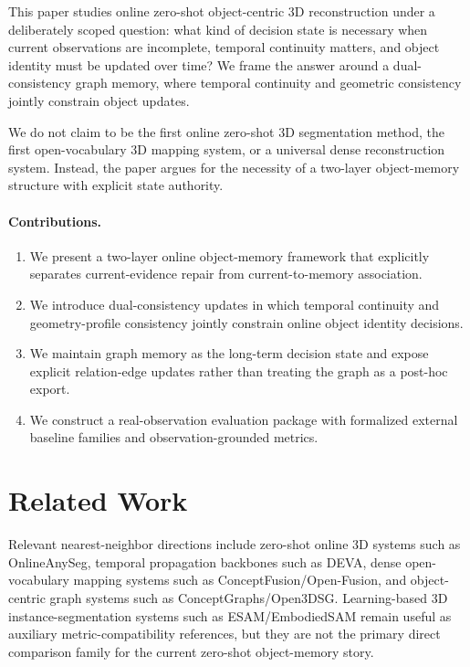\documentclass[11pt]{article}
\begin{document}
This paper studies online zero-shot object-centric 3D reconstruction under a deliberately scoped question: what kind of decision state is necessary when current observations are incomplete, temporal continuity matters, and object identity must be updated over time? We frame the answer around a dual-consistency graph memory, where temporal continuity and geometric consistency jointly constrain object updates.

We do not claim to be the first online zero-shot 3D segmentation method, the first open-vocabulary 3D mapping system, or a universal dense reconstruction system. Instead, the paper argues for the necessity of a two-layer object-memory structure with explicit state authority.

\paragraph{Contributions.}
\begin{enumerate}
\item We present a two-layer online object-memory framework that explicitly separates current-evidence repair from current-to-memory association.
\item We introduce dual-consistency updates in which temporal continuity and geometry-profile consistency jointly constrain online object identity decisions.
\item We maintain graph memory as the long-term decision state and expose explicit relation-edge updates rather than treating the graph as a post-hoc export.
\item We construct a real-observation evaluation package with formalized external baseline families and observation-grounded metrics.
\end{enumerate}

\section{Related Work}
Relevant nearest-neighbor directions include zero-shot online 3D systems such as OnlineAnySeg, temporal propagation backbones such as DEVA, dense open-vocabulary mapping systems such as ConceptFusion/Open-Fusion, and object-centric graph systems such as ConceptGraphs/Open3DSG. Learning-based 3D instance-segmentation systems such as ESAM/EmbodiedSAM remain useful as auxiliary metric-compatibility references, but they are not the primary direct comparison family for the current zero-shot object-memory story.
\end{document}
